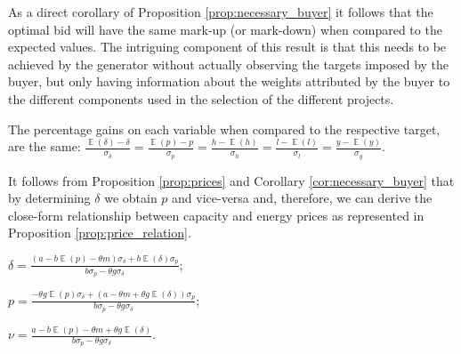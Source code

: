 \documentclass[informs]{informs3}
\begin{document}
As a direct corollary of Proposition  \ref{prop:necessary_buyer} it follows that the optimal bid will have the same mark-up (or mark-down) when compared to the expected values. The intriguing component of this result is that this needs to be achieved by the generator without actually observing the targets imposed by the buyer, but only having information about the weights attributed by the buyer to the different components used in the selection of the different projects.  

\begin{corollary}\label{cor:necessary_buyer}
	The percentage gains on each variable when compared to the respective target, are the same:
$\frac{\mathop{\mathbb{E}}\left(\delta\right)-\delta}{\sigma_{\delta}}= \frac{\mathop{\mathbb{E}}\left(p\right)-p}{\sigma_{p}}=\frac{h-\mathop{\mathbb{E}}\left(h\right)}{\sigma_{h}}=\frac{l-\mathop{\mathbb{E}}\left(l\right)}{\sigma_{l}}=
\frac{y-\mathop{\mathbb{E}}\left(y\right)}{\sigma_{y}}$.
\end{corollary}


It follows from Proposition \ref{prop:prices} and Corollary \ref{cor:necessary_buyer} that by determining $\delta$ we obtain $p$ and vice-versa and, therefore, we can derive the close-form relationship between capacity and energy prices as represented in Proposition \ref{prop:price_relation}.


\begin{proposition}\label{prop:price_relation}
	
$\delta=\frac{\left(a-b\mathop{\mathbb{E}}\left(p\right) -\theta m\right)\sigma_{\delta}+b\mathop{\mathbb{E}}\left(\delta\right)\sigma_{p}}{b\sigma_{p}-\theta g\sigma_{\delta}}$;

$p =\frac{-\theta g \mathop{\mathbb{E}}\left(p\right)\sigma_{\delta}+\left(a-\theta m+\theta g \mathop{\mathbb{E}}\left(\delta\right)\right)\sigma_{p}}{b\sigma_{p}-\theta g\sigma_{\delta}}$;	


$\nu =\frac{a-b \mathop{\mathbb{E}}\left(p\right)-\theta m+\theta g \mathop{\mathbb{E}}\left(\delta\right)}{b\sigma_{p}-\theta g\sigma_{\delta}}$.
\end{proposition}
\end{document}
